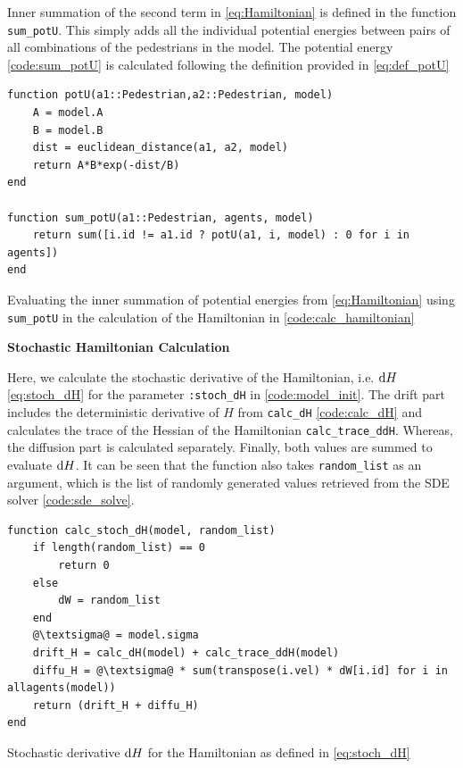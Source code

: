 Inner summation of the second term in \autoref{eq:Hamiltonian} is defined in the function \texttt{sum\_potU}. This simply adds all the individual potential energies between pairs of all combinations of the pedestrians in the model. The potential energy \autoref{code:sum_potU} is calculated following the definition provided in \autoref{eq:def_potU}
\begin{listing}[H]
\begin{verbatim}    
function potU(a1::Pedestrian,a2::Pedestrian, model)
    A = model.A
    B = model.B
    dist = euclidean_distance(a1, a2, model)
    return A*B*exp(-dist/B)
end

function sum_potU(a1::Pedestrian, agents, model)
    return sum([i.id != a1.id ? potU(a1, i, model) : 0 for i in agents])
end
\end{verbatim}
\caption{Evaluating the inner summation of potential energies from \autoref{eq:Hamiltonian} using \texttt{sum\_potU} in the calculation of the Hamiltonian in \autoref{code:calc_hamiltonian}}
\label{code:sum_potU}
\end{listing}

\pagebreak
\textbf{Stochastic Hamiltonian Calculation}

Here, we calculate the stochastic derivative of the Hamiltonian, i.e. $\mathrm d H$ \autoref{eq:stoch_dH} for the parameter \texttt{:stoch\_dH} in \autoref{code:model_init}. The drift part includes the deterministic derivative of $H$ from \texttt{calc\_dH} \autoref{code:calc_dH} and calculates the trace of the Hessian of the Hamiltonian \texttt{calc\_trace\_ddH}. Whereas, the diffusion part is calculated separately. Finally, both values are summed to evaluate $\mathrm d H$. It can be seen that the function also takes \texttt{random\_list} as an argument, which is the list of randomly generated values retrieved from the SDE solver \autoref{code:sde_solve}.
\begin{listing}[H]
\begin{verbatim}    
function calc_stoch_dH(model, random_list)
    if length(random_list) == 0
        return 0
    else
        dW = random_list
    end
    @\textsigma@ = model.sigma
    drift_H = calc_dH(model) + calc_trace_ddH(model)
    diffu_H = @\textsigma@ * sum(transpose(i.vel) * dW[i.id] for i in allagents(model))
    return (drift_H + diffu_H)
end
\end{verbatim}
\caption{Stochastic derivative $\d H$ for the Hamiltonian as defined in \autoref{eq:stoch_dH}}
\label{code:calc_stoch_H}
\end{listing}

